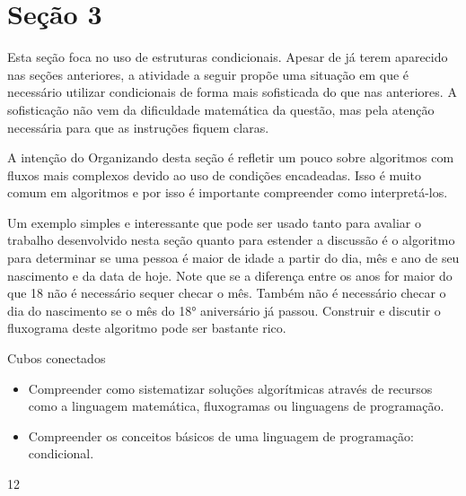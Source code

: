 \section{Seção 3}

\cleardoublepage
\def\currentcolor{session1}
\begin{texto}
{
Esta seção foca no uso de estruturas condicionais. Apesar de já terem aparecido nas seções anteriores, a atividade a seguir propõe uma situação em que é necessário utilizar condicionais de forma mais sofisticada do que nas anteriores. A sofisticação não vem da dificuldade matemática da questão, mas pela atenção necessária para que as instruções fiquem claras.

A intenção do Organizando desta seção é refletir um pouco sobre algoritmos com fluxos mais complexos devido ao uso de condições encadeadas. Isso é muito comum em algoritmos e por isso é importante compreender como interpretá-los.

Um exemplo simples e interessante que pode ser usado tanto para avaliar o trabalho desenvolvido nesta seção quanto para estender a discussão é o algoritmo para determinar se uma pessoa é maior de idade a partir do dia, mês e ano de seu nascimento e da data de hoje. Note que se a diferença entre os anos for maior do que 18 não é necessário sequer checar o mês. Também não é necessário checar o dia do nascimento se o mês do 18° aniversário já passou. Construir e discutir o fluxograma deste algoritmo pode ser bastante rico.	
}
\end{texto}
\clearmargin
\begin{objectives}{Cubos conectados}
{
\begin{itemize}
\item Compreender como sistematizar soluções algorítmicas através de recursos como a linguagem matemática, fluxogramas ou linguagens de programação.

\item Compreender os conceitos básicos de uma linguagem de programação: condicional.
\end{itemize}
}{1}{2}
\end{objectives}
